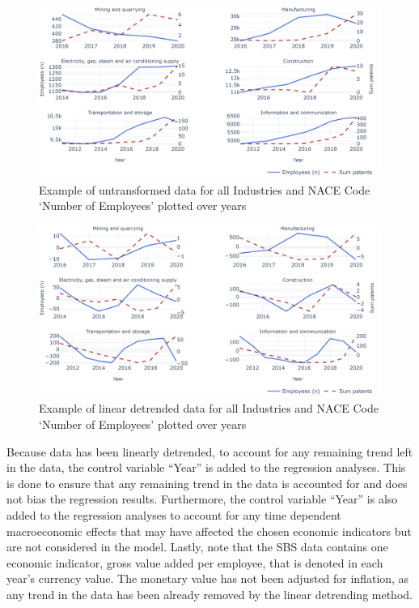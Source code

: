 \documentclass[
  12pt,
  a4paperpaper,
]{article}
\begin{document}
\begin{figure}[H]

{\centering \includegraphics{rieg2023_files/figure-pdf/fig-untransformed-data-example-output-1.jpeg}

}

\caption{\label{fig-untransformed-data-example}Example of untransformed
data for all Industries and NACE Code `Number of Employees' plotted over
years}

\end{figure}

\begin{figure}[H]

{\centering \includegraphics{rieg2023_files/figure-pdf/fig-transformed-data-example-output-1.jpeg}

}

\caption{\label{fig-transformed-data-example}Example of linear detrended
data for all Industries and NACE Code `Number of Employees' plotted over
years}

\end{figure}

Because data has been linearly detrended, to account for any remaining
trend left in the data, the control variable ``Year'' is added to the
regression analyses. This is done to ensure that any remaining trend in
the data is accounted for and does not bias the regression results.
Furthermore, the control variable ``Year'' is also added to the
regression analyses to account for any time dependent macroeconomic
effects that may have affected the chosen economic indicators but are
not considered in the model. Lastly, note that the SBS data contains one
economic indicator, gross value added per employee, that is denoted in
each year's currency value. The monetary value has not been adjusted for
inflation, as any trend in the data has been already removed by the
linear detrending method.
\end{document}
